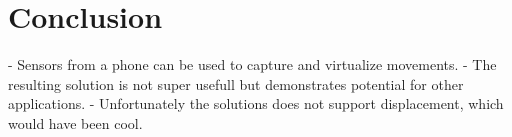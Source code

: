 \section{Conclusion}
- Sensors from a phone can be used to capture and virtualize movements.
- The resulting solution is not super usefull but demonstrates potential for other applications.
- Unfortunately the solutions does not support displacement, which would have been cool.

